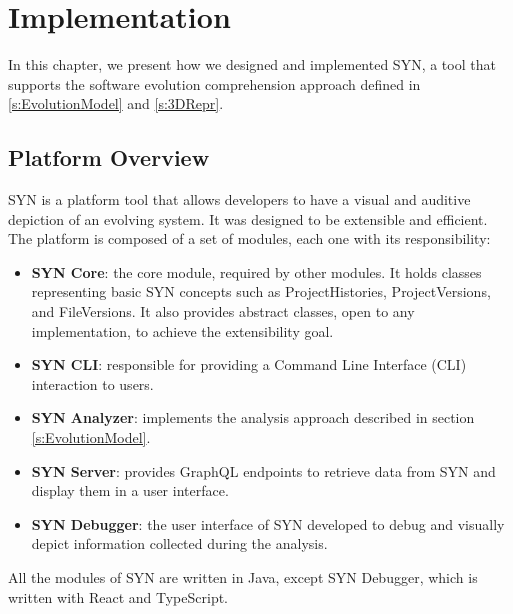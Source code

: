 
\chapter[Implementation]{Implementation}
\graphicspath{ {images/implementation} }
In this chapter, we present how we designed and implemented SYN, a tool that supports the software evolution comprehension approach 
defined in \autoref{s:EvolutionModel} and \autoref{s:3DRepr}. 


\section{Platform Overview}

SYN is a platform tool that allows developers to have a visual and auditive depiction of an evolving system. 
It was designed to be extensible and efficient. The platform is composed of a set of modules, each one with its responsibility:
\begin{itemize}
    \item \textbf{SYN Core}: the core module, required by other modules. It holds classes representing basic SYN concepts such as ProjectHistories, ProjectVersions, and FileVersions. It also provides abstract classes, open to any implementation, to achieve the extensibility goal.
    \item \textbf{SYN CLI}: responsible for providing a Command Line Interface (CLI) interaction to users.
    \item \textbf{SYN Analyzer}: implements the analysis approach described in section \ref{s:EvolutionModel}. 
    \item \textbf{SYN Server}: provides GraphQL endpoints to retrieve data from SYN and display them in a user interface. 
    \item \textbf{SYN Debugger}: the user interface of SYN developed to debug and visually depict information collected during the analysis. 
\end{itemize}

All the modules of SYN are written in Java, except SYN Debugger, which is written with React and TypeScript. 

